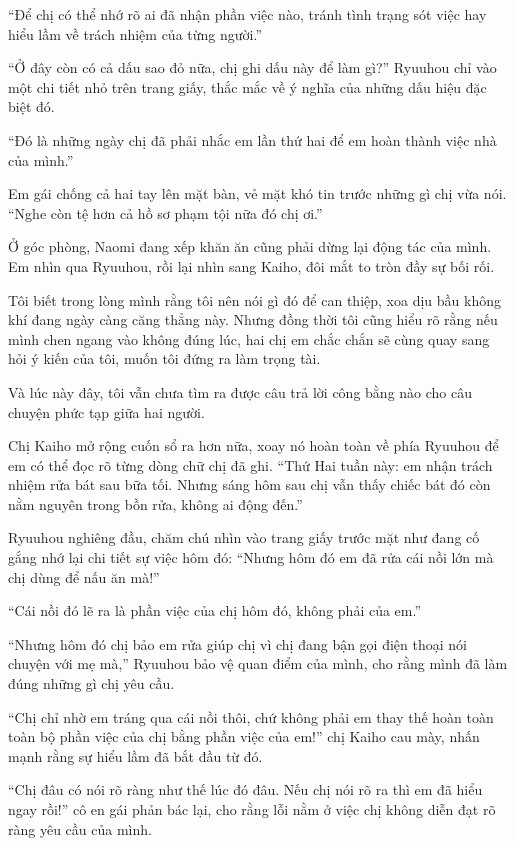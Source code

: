 \documentclass[../main.tex]{subfiles}
\begin{document}
``Để chị có thể nhớ rõ ai đã nhận phần việc nào, tránh tình trạng sót việc hay hiểu lầm về trách nhiệm của từng người.''

``Ở đây còn có cả dấu sao đỏ nữa, chị ghi dấu này để làm gì?'' Ryuuhou chỉ vào một chi tiết nhỏ trên trang giấy, thắc mắc về ý nghĩa của những dấu hiệu đặc biệt đó.

``Đó là những ngày chị đã phải nhắc em lần thứ hai để em hoàn thành việc nhà của mình.''

Em gái chống cả hai tay lên mặt bàn, vẻ mặt khó tin trước những gì chị vừa nói. ``Nghe còn tệ hơn cả hồ sơ phạm tội nữa đó chị ơi.''

Ở góc phòng, Naomi đang xếp khăn ăn cũng phải dừng lại động tác của mình. Em nhìn qua Ryuuhou, rồi lại nhìn sang Kaiho, đôi mắt to tròn đầy sự bối rối.

Tôi biết trong lòng mình rằng tôi nên nói gì đó để can thiệp, xoa dịu bầu không khí đang ngày càng căng thẳng này. Nhưng đồng thời tôi cũng hiểu rõ rằng nếu mình chen ngang vào không đúng lúc, hai chị em chắc chắn sẽ cùng quay sang hỏi ý kiến của tôi, muốn tôi đứng ra làm trọng tài.

Và lúc này đây, tôi vẫn chưa tìm ra được câu trả lời công bằng nào cho câu chuyện phức tạp giữa hai người.

Chị Kaiho mở rộng cuốn sổ ra hơn nữa, xoay nó hoàn toàn về phía Ryuuhou để em có thể đọc rõ từng dòng chữ chị đã ghi. ``Thứ Hai tuần này: em nhận trách nhiệm rửa bát sau bữa tối. Nhưng sáng hôm sau chị vẫn thấy chiếc bát đó còn nằm nguyên trong bồn rửa, không ai động đến.''

Ryuuhou nghiêng đầu, chăm chú nhìn vào trang giấy trước mặt như đang cố gắng nhớ lại chi tiết sự việc hôm đó: ``Nhưng hôm đó em đã rửa cái nồi lớn mà chị dùng để nấu ăn mà!''

``Cái nồi đó lẽ ra là phần việc của chị hôm đó, không phải của em.''

``Nhưng hôm đó chị bảo em rửa giúp chị vì chị đang bận gọi điện thoại nói chuyện với mẹ mà,'' Ryuuhou bảo vệ quan điểm của mình, cho rằng mình đã làm đúng những gì chị yêu cầu.

``Chị chỉ nhờ em tráng qua cái nồi thôi, chứ không phải em thay thế hoàn toàn toàn bộ phần việc của chị bằng phần việc của em!'' chị Kaiho cau mày, nhấn mạnh rằng sự hiểu lầm đã bắt đầu từ đó.

``Chị đâu có nói rõ ràng như thế lúc đó đâu. Nếu chị nói rõ ra thì em đã hiểu ngay rồi!'' cô en gái phản bác lại, cho rằng lỗi nằm ở việc chị không diễn đạt rõ ràng yêu cầu của mình.
\end{document}
